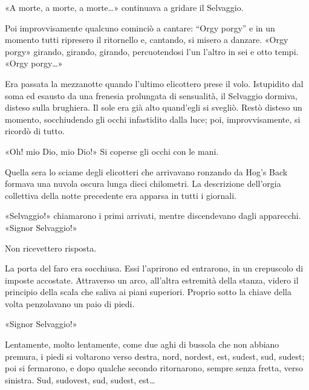 \documentclass[
a5paper, %
10pt, %
twoside, 
onecolumn, %
openany, %
]{memoir}
\begin{document}
«A morte, a morte, a morte…» continuava a gridare il Selvaggio.

Poi improvvisamente qualcuno cominciò a cantare: “Orgy porgy” e in un momento tutti ripresero il ritornello e, cantando, si misero a danzare. «Orgy porgy» girando, girando, girando, percuotendosi l’un l’altro in sei e otto tempi. «Orgy porgy…»

Era passata la mezzanotte quando l’ultimo elicottero prese il volo. Istupidito dal soma ed esausto da una frenesia prolungata di sensualità, il Selvaggio dormiva, disteso sulla brughiera. Il sole era già alto quand’egli si svegliò. Restò disteso un momento, socchiudendo gli occhi infastidito dalla luce; poi, improvvisamente, si ricordò di tutto.

«Oh! mio Dio, mio Dio!» Si coperse gli occhi con le mani.

Quella sera lo sciame degli elicotteri che arrivavano ronzando da Hog’s Back formava una nuvola oscura lunga dieci chilometri. La descrizione dell’orgia collettiva della notte precedente era apparsa in tutti i giornali.

«Selvaggio!» chiamarono i primi arrivati, mentre discendevano dagli apparecchi. «Signor Selvaggio!»

Non ricevettero risposta.

La porta del faro era socchiusa. Essi l’aprirono ed entrarono, in un crepuscolo di imposte accostate. Attraverso un arco, all’altra estremità della stanza, videro il principio della scala che saliva ai piani superiori. Proprio sotto la chiave della volta penzolavano un paio di piedi.

«Signor Selvaggio!»

Lentamente, molto lentamente, come due aghi di bussola che non abbiano premura, i piedi si voltarono verso destra, nord, nordest, est, sudest, sud, sudest; poi si fermarono, e dopo qualche secondo ritornarono, sempre senza fretta, verso sinistra. Sud, sudovest, sud, sudest, est…



\backmatter


% 
% 


\tableofcontents*
\clearpage
\end{document}
